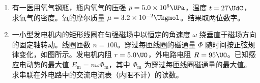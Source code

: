 \documentclass[\gkver]{gaokaozhenti}
\begin{document}
\begin{enumerate}
\begin{enumerate}
	\item
	若要观测此信号源发出的正弦交流信号的波形，应将信号源的 $a$ 端与示波器面板上的  接线柱相连，$b$ 端与  接线柱相连。

	\item
	若示波器所显示的输入波形如图 \ref{2000天津16c} 所示，要将波形上移，应调节面板上的  旋钮；要使此波形横向展宽，应调节  旋钮；要使屏上能够显示 3 个完整的波形，应调节  旋钮。
\end{enumerate}




\item
有一医用氧气钢瓶，瓶内氧气的压强 $p=5.0\times10^{6}\UPa$，温度 $t=27\UdC$，求氧气的密度。氧的摩尔质量 $\mu=3.2\times10^{-2}\Ukgmol$。结果取两位数字。

\jdanswer{$\rho = 64\Ukgmc$}


\item
一小型发电机内的矩形线圈在匀强磁场中以恒定的角速度 $\omega$ 绕垂直于磁场方向的固定轴转动。线圈匝数 $n=100$。穿过每匝线圈的磁通量 $\Phi$ 随时间按正弦规律变化，如图所示。发电机内阻 $r=5.0\UO$，外电路电阻 $R=95\UO$。已知感应电动势的最大值 $E_{\mathrm{m}}=n\omega\Phi_{\mathrm{m}}$，其中 $\Phi_{\mathrm{m}}$ 为穿过每匝线圈磁通量的最大值。求串联在外电路中的交流电流表（内阻不计）的读数。


\end{enumerate}
\end{document}
